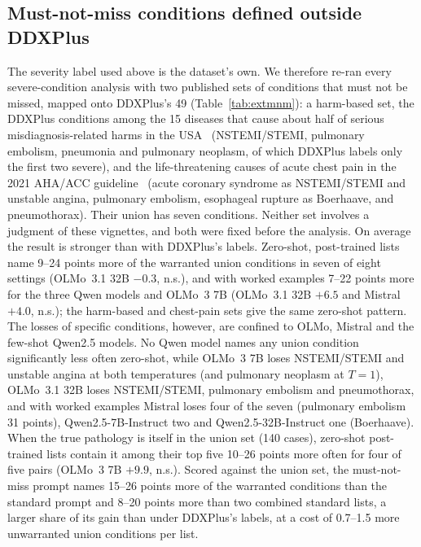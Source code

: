 \documentclass[wcp]{jmlr}
\begin{document}
\subsection{Must-not-miss conditions defined outside DDXPlus}\label{sec:extmnm}
The severity label used above is the dataset's own. We therefore re-ran every severe-condition analysis with two published sets of conditions that must not be missed, mapped onto DDXPlus's 49 (Table~\ref{tab:extmnm}): a harm-based set, the DDXPlus conditions among the 15 diseases that cause about half of serious misdiagnosis-related harms in the USA~\citep{newmantoker2024burden} (NSTEMI/STEMI, pulmonary embolism, pneumonia and pulmonary neoplasm, of which DDXPlus labels only the first two severe), and the life-threatening causes of acute chest pain in the 2021 AHA/ACC guideline~\citep{gulati2021chestpain} (acute coronary syndrome as NSTEMI/STEMI and unstable angina, pulmonary embolism, esophageal rupture as Boerhaave, and pneumothorax). Their union has seven conditions. Neither set involves a judgment of these vignettes, and both were fixed before the analysis.
On average the result is stronger than with DDXPlus's labels. Zero-shot, post-trained lists name 9--24 points more of the warranted union conditions in seven of eight settings (OLMo~3.1 32B $-0.3$, n.s.), and with worked examples 7--22 points more for the three Qwen models and OLMo~3 7B (OLMo~3.1 32B $+6.5$ and Mistral $+4.0$, n.s.); the harm-based and chest-pain sets give the same zero-shot pattern. The losses of specific conditions, however, are confined to OLMo, Mistral and the few-shot Qwen2.5 models. No Qwen model names any union condition significantly less often zero-shot, while OLMo~3 7B loses NSTEMI/STEMI and unstable angina at both temperatures (and pulmonary neoplasm at $T{=}1$), OLMo~3.1 32B loses NSTEMI/STEMI, pulmonary embolism and pneumothorax, and with worked examples Mistral loses four of the seven (pulmonary embolism 31 points), Qwen2.5-7B-Instruct two and Qwen2.5-32B-Instruct one (Boerhaave). When the true pathology is itself in the union set (140 cases), zero-shot post-trained lists contain it among their top five 10--26 points more often for four of five pairs (OLMo~3 7B $+9.9$, n.s.). Scored against the union set, the must-not-miss prompt names 15--26 points more of the warranted conditions than the standard prompt and 8--20 points more than two combined standard lists, a larger share of its gain than under DDXPlus's labels, at a cost of 0.7--1.5 more unwarranted union conditions per list.
\end{document}
